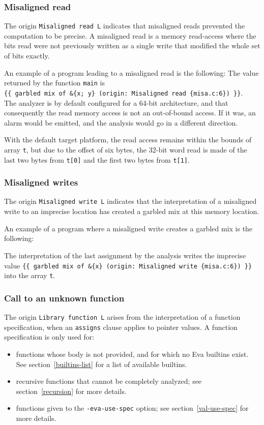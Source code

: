 \documentclass{frama-c-book}
\begin{document}
\subsubsection{Misaligned read}

The origin \lstinline$Misaligned read L$ indicates that
misaligned reads prevented the computation to be precise.
A misaligned read is a memory read-access where the bits read were not
previously written as a single write that modified the whole set of
bits exactly.

An example of a program leading to a misaligned read is the following:
The value returned by the function \lstinline|main| is\\
\lstinline|{{ garbled mix of &{x; y} (origin: Misaligned read {misa.c:6}) }}|.\\
The analyzer is by default configured for a 64-bit architecture,
and that consequently the read memory access is not an out-of-bound access.
If it was, an alarm would be emitted, and the
analysis would go in a different direction.

With the default target platform, the read access remains
within the bounds of array \lstinline|t|,
but due to the offset of six bytes,
the 32-bit word read is made of the last two bytes from \lstinline|t[0]|
and the first two bytes from \lstinline|t[1]|.

\subsubsection{Misaligned writes}

The origin \lstinline$Misaligned write L$ indicates that the interpretation of
a misaligned write to an imprecise location has created a garbled mix at this
memory location.

An example of a program where a misaligned write creates a garbled mix
is the following:

The interpretation of the last assignment by the analysis writes
the imprecise value
\lstinline|{{ garbled mix of &{x} (origin: Misaligned write {misa.c:6}) }}|
into the array \lstinline|t|.

\subsubsection{Call to an unknown function}
The origin \lstinline$Library function L$ arises from the interpretation
of a function specification, when an \lstinline|assigns| clause applies to
pointer values.
A function specification is only used for:
\begin{itemize}
\item
  functions whose body is not provided, and for which no Eva builtins
  exist. See section~\ref{builtins-list} for a list of available builtins.
\item
  recursive functions that cannot be completely analyzed;
  see section~\ref{recursion} for more details.
\item
  functions given to the \verb+-eva-use-spec+ option;
  see section~\ref{val-use-spec} for more details.
\end{itemize}
\end{document}
